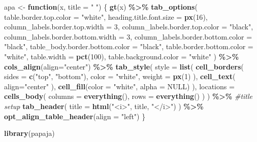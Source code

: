 \documentclass[
]{article}
\newenvironment{Shaded}{\begin{snugshade}}{\end{snugshade}}
\newcommand{\AttributeTok}[1]{\textcolor[rgb]{0.13,0.29,0.53}{#1}}
\newcommand{\CommentTok}[1]{\textcolor[rgb]{0.56,0.35,0.01}{\textit{#1}}}
\newcommand{\ConstantTok}[1]{\textcolor[rgb]{0.56,0.35,0.01}{#1}}
\newcommand{\ControlFlowTok}[1]{\textcolor[rgb]{0.13,0.29,0.53}{\textbf{#1}}}
\newcommand{\DecValTok}[1]{\textcolor[rgb]{0.00,0.00,0.81}{#1}}
\newcommand{\FunctionTok}[1]{\textcolor[rgb]{0.13,0.29,0.53}{\textbf{#1}}}
\newcommand{\NormalTok}[1]{#1}
\newcommand{\OtherTok}[1]{\textcolor[rgb]{0.56,0.35,0.01}{#1}}
\newcommand{\SpecialCharTok}[1]{\textcolor[rgb]{0.81,0.36,0.00}{\textbf{#1}}}
\newcommand{\StringTok}[1]{\textcolor[rgb]{0.31,0.60,0.02}{#1}}
\begin{document}
\begin{Shaded}
\begin{Highlighting}[]
\NormalTok{apa }\OtherTok{\textless{}{-}} \ControlFlowTok{function}\NormalTok{(x, }\AttributeTok{title =} \StringTok{" "}\NormalTok{) \{}
  \FunctionTok{gt}\NormalTok{(x) }\SpecialCharTok{\%\textgreater{}\%}
  \FunctionTok{tab\_options}\NormalTok{(}
    \AttributeTok{table.border.top.color =} \StringTok{"white"}\NormalTok{,}
    \AttributeTok{heading.title.font.size =} \FunctionTok{px}\NormalTok{(}\DecValTok{16}\NormalTok{),}
    \AttributeTok{column\_labels.border.top.width =} \DecValTok{3}\NormalTok{,}
    \AttributeTok{column\_labels.border.top.color =} \StringTok{"black"}\NormalTok{,}
    \AttributeTok{column\_labels.border.bottom.width =} \DecValTok{3}\NormalTok{,}
    \AttributeTok{column\_labels.border.bottom.color =} \StringTok{"black"}\NormalTok{,}
    \AttributeTok{table\_body.border.bottom.color =} \StringTok{"black"}\NormalTok{,}
    \AttributeTok{table.border.bottom.color =} \StringTok{"white"}\NormalTok{,}
    \AttributeTok{table.width =} \FunctionTok{pct}\NormalTok{(}\DecValTok{100}\NormalTok{),}
    \AttributeTok{table.background.color =} \StringTok{"white"}
\NormalTok{  ) }\SpecialCharTok{\%\textgreater{}\%}
  \FunctionTok{cols\_align}\NormalTok{(}\AttributeTok{align=}\StringTok{"center"}\NormalTok{) }\SpecialCharTok{\%\textgreater{}\%}
  \FunctionTok{tab\_style}\NormalTok{(}
    \AttributeTok{style =} \FunctionTok{list}\NormalTok{(}
      \FunctionTok{cell\_borders}\NormalTok{(}
        \AttributeTok{sides =} \FunctionTok{c}\NormalTok{(}\StringTok{"top"}\NormalTok{, }\StringTok{"bottom"}\NormalTok{),}
        \AttributeTok{color =} \StringTok{"white"}\NormalTok{,}
        \AttributeTok{weight =} \FunctionTok{px}\NormalTok{(}\DecValTok{1}\NormalTok{)}
\NormalTok{      ),}
      \FunctionTok{cell\_text}\NormalTok{(}
        \AttributeTok{align=}\StringTok{"center"}
\NormalTok{      ),}
      \FunctionTok{cell\_fill}\NormalTok{(}\AttributeTok{color =} \StringTok{"white"}\NormalTok{, }\AttributeTok{alpha =} \ConstantTok{NULL}\NormalTok{)}
\NormalTok{      ),}
    \AttributeTok{locations =} \FunctionTok{cells\_body}\NormalTok{(}
      \AttributeTok{columns =} \FunctionTok{everything}\NormalTok{(),}
      \AttributeTok{rows =} \FunctionTok{everything}\NormalTok{()}
\NormalTok{    )}
\NormalTok{  ) }\SpecialCharTok{\%\textgreater{}\%}
    \CommentTok{\#title setup}
    \FunctionTok{tab\_header}\NormalTok{(}
    \AttributeTok{title =} \FunctionTok{html}\NormalTok{(}\StringTok{"\textless{}i\textgreater{}"}\NormalTok{, title, }\StringTok{"\textless{}/i\textgreater{}"}\NormalTok{)}
\NormalTok{  ) }\SpecialCharTok{\%\textgreater{}\%}
  \FunctionTok{opt\_align\_table\_header}\NormalTok{(}\AttributeTok{align =} \StringTok{"left"}\NormalTok{)}
\NormalTok{\}}

\FunctionTok{library}\NormalTok{(papaja)}
\end{Highlighting}
\end{Shaded}
\end{document}
